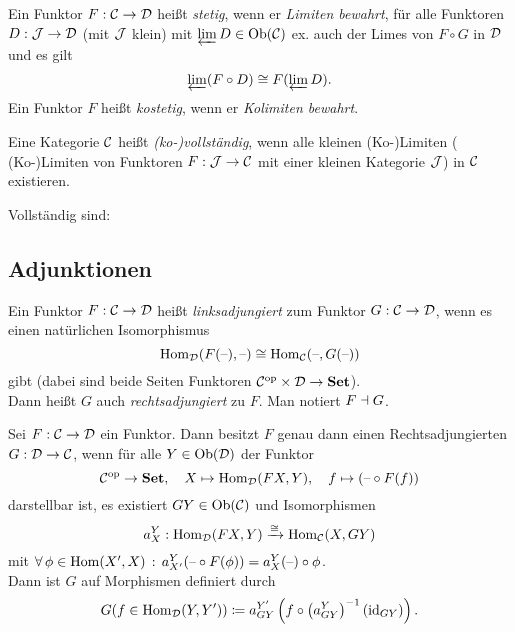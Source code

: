 \documentclass{cheat-sheet}
\begin{document}
\begin{defn}
  Ein Funktor $F : \mathcal{C} \to \mathcal{D}$ heißt \emph{stetig}, wenn er \emph{Limiten bewahrt}, \dh{} für alle Funktoren $D : \mathcal{J} \to \mathcal{D}$ (mit $\mathcal{J}$ klein) mit $\varprojlim D \in \operatorname{Ob}(\mathcal{C})$ ex. auch der Limes von $F \circ G$ in $\mathcal{D}$ und es gilt
  \[ \varprojlim (F \circ D) \cong F(\varprojlim D). \]
  Ein Funktor $F$ heißt \emph{kostetig}, wenn er \emph{Kolimiten bewahrt}.
\end{defn}

\begin{defn}
  Eine Kategorie $\mathcal{C}$ heißt \emph{(ko-)vollständig}, wenn alle kleinen (Ko-)Limiten (\dh{} (Ko-)Limiten von Funktoren $F : \mathcal{J} \to \mathcal{C}$ mit einer kleinen Kategorie $\mathcal{J}$) in $\mathcal{C}$ existieren.
\end{defn}

\begin{bspe}
  Vollständig sind: \enspace
  \inlineitem{$\SetC$,}
  \inlineitem{$\Grp$,}
  \inlineitem{$\AbGrp$,}
  \inlineitem{$\Top$,}
\end{bspe}


\begin{samepage}
  \subsection{Adjunktionen}
\end{samepage}

\begin{defn}
  Ein Funktor $F : \mathcal{C} \to \mathcal{D}$ heißt \emph{linksadjungiert} zum Funktor $G : \mathcal{C} \to \mathcal{D}$, wenn es einen natürlichen Isomorphismus
  \[
    \operatorname{Hom}_{\mathcal{D}}(F(\text{--}), \text{--}) \cong \operatorname{Hom}_{\mathcal{C}}(\text{--}, G(\text{--}))
  \]
  gibt (dabei sind beide Seiten Funktoren $\mathcal{C}^{\mathrm{op}} \times \mathcal{D} \to \mathbf{Set}$). \\
  Dann heißt $G$ auch \emph{rechtsadjungiert} zu $F$. Man notiert $F \dashv G$.
\end{defn}

\begin{bem}
  Sei $F : \mathcal{C} \to \mathcal{D}$ ein Funktor.
  Dann besitzt $F$ genau dann einen Rechtsadjungierten $G : \mathcal{D} \to \mathcal{C}$, wenn für alle $Y \in \operatorname{Ob}(\mathcal{D})$ der Funktor
  \[
    \mathcal{C}^{\mathrm{op}} \to \mathbf{Set}, \quad
    X \mapsto \operatorname{Hom}_{\mathcal{D}}(FX, Y), \quad
    f \mapsto (\text{--} \circ F(f))
  \]
  darstellbar ist, \dh{} es existiert $GY \in \operatorname{Ob}(\mathcal{C})$ und Isomorphismen
  \[ a^Y_X : \operatorname{Hom}_{\mathcal{D}}(FX, Y) \xrightarrow{\cong} \operatorname{Hom}_{\mathcal{C}}(X, GY) \]
  mit $\forall \, {\phi \in \operatorname{Hom}(X', X)} \,:\, a^Y_{X'}(\text{--} \circ F(\phi)) = a^Y_X(\text{--}) \circ \phi$. \\
  Dann ist $G$ auf Morphismen definiert durch
  \[ G(f \in \operatorname{Hom}_{\mathcal{D}}(Y, Y')) \coloneqq a^{Y'}_{GY} \left( f \circ \left( a^Y_{GY} \right)^{-1} (\operatorname{id}_{GY}) \right). \]
\end{bem}
\end{document}
